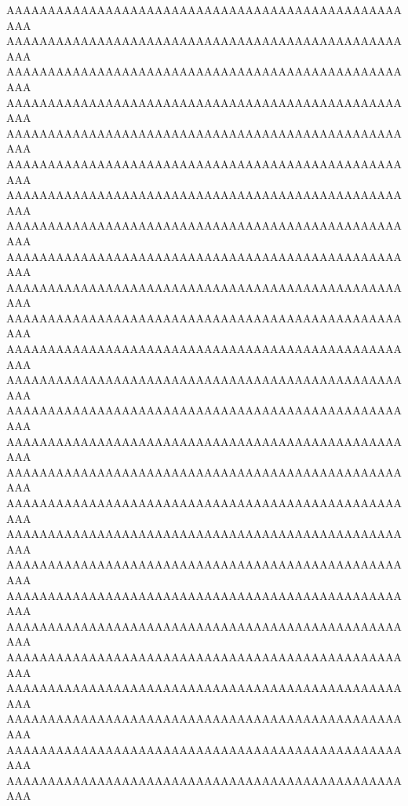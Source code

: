 \documentclass[final,11pt,baselinegrid]{../../uit-thesis}
\begin{document}
AAAAAAAAAAAAAAAAAAAAAAAAAAAAAAAAAAAAAAAAAAAAAAAAAAA\newline
%
AAAAAAAAAAAAAAAAAAAAAAAAAAAAAAAAAAAAAAAAAAAAAAAAAAA\newline
AAAAAAAAAAAAAAAAAAAAAAAAAAAAAAAAAAAAAAAAAAAAAAAAAAA\newline
AAAAAAAAAAAAAAAAAAAAAAAAAAAAAAAAAAAAAAAAAAAAAAAAAAA\newline
AAAAAAAAAAAAAAAAAAAAAAAAAAAAAAAAAAAAAAAAAAAAAAAAAAA\newline
AAAAAAAAAAAAAAAAAAAAAAAAAAAAAAAAAAAAAAAAAAAAAAAAAAA\newline
AAAAAAAAAAAAAAAAAAAAAAAAAAAAAAAAAAAAAAAAAAAAAAAAAAA\newline
AAAAAAAAAAAAAAAAAAAAAAAAAAAAAAAAAAAAAAAAAAAAAAAAAAA\newline
AAAAAAAAAAAAAAAAAAAAAAAAAAAAAAAAAAAAAAAAAAAAAAAAAAA\newline
AAAAAAAAAAAAAAAAAAAAAAAAAAAAAAAAAAAAAAAAAAAAAAAAAAA\newline
AAAAAAAAAAAAAAAAAAAAAAAAAAAAAAAAAAAAAAAAAAAAAAAAAAA\newline
AAAAAAAAAAAAAAAAAAAAAAAAAAAAAAAAAAAAAAAAAAAAAAAAAAA\newline
AAAAAAAAAAAAAAAAAAAAAAAAAAAAAAAAAAAAAAAAAAAAAAAAAAA\newline
AAAAAAAAAAAAAAAAAAAAAAAAAAAAAAAAAAAAAAAAAAAAAAAAAAA\newline
AAAAAAAAAAAAAAAAAAAAAAAAAAAAAAAAAAAAAAAAAAAAAAAAAAA\newline
AAAAAAAAAAAAAAAAAAAAAAAAAAAAAAAAAAAAAAAAAAAAAAAAAAA\newline
AAAAAAAAAAAAAAAAAAAAAAAAAAAAAAAAAAAAAAAAAAAAAAAAAAA\newline
AAAAAAAAAAAAAAAAAAAAAAAAAAAAAAAAAAAAAAAAAAAAAAAAAAA\newline
AAAAAAAAAAAAAAAAAAAAAAAAAAAAAAAAAAAAAAAAAAAAAAAAAAA\newline
AAAAAAAAAAAAAAAAAAAAAAAAAAAAAAAAAAAAAAAAAAAAAAAAAAA\newline
AAAAAAAAAAAAAAAAAAAAAAAAAAAAAAAAAAAAAAAAAAAAAAAAAAA\newline
AAAAAAAAAAAAAAAAAAAAAAAAAAAAAAAAAAAAAAAAAAAAAAAAAAA\newline
AAAAAAAAAAAAAAAAAAAAAAAAAAAAAAAAAAAAAAAAAAAAAAAAAAA\newline
AAAAAAAAAAAAAAAAAAAAAAAAAAAAAAAAAAAAAAAAAAAAAAAAAAA\newline
AAAAAAAAAAAAAAAAAAAAAAAAAAAAAAAAAAAAAAAAAAAAAAAAAAA\newline
AAAAAAAAAAAAAAAAAAAAAAAAAAAAAAAAAAAAAAAAAAAAAAAAAAA\newline
\end{document}
